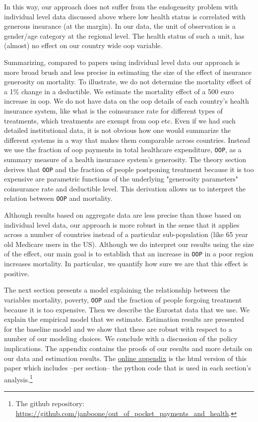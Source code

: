 \documentclass[a4paper,12pt]{article}
\begin{document}
In this way, our approach does not suffer from the endogeneity problem with individual level data discussed above where low health status is correlated with generous insurance (at the margin). In our data, the unit of observation is a gender/age category at the regional level. The health status of such a unit, has (almost) no effect on our country wide oop variable.

Summarizing, compared to papers using individual level data our approach is more broad brush and less precise in estimating the size of the effect of insurance generosity on mortality. To illustrate, we do not determine the mortality effect of a 1\% change in a deductible. We estimate the mortality effect of a 500 euro increase in oop. We do not have data on the oop details of each country's health insurance system, like what is the coinsurance rate for different types of treatments, which treatments are exempt from oop etc. Even if we had such detailed institutional data, it is not obvious how one would summarize the different systems in a way that makes them comparable across countries. Instead we use the fraction of oop payments in total healthcare expenditure, \texttt{OOP}, as a summary measure of a health insurance system's generosity. The theory section derives that \texttt{OOP} and the fraction of people postponing treatment because it is too expensive are parametric functions of the underlying "generosity parameters" coinsurance rate and deductible level. This derivation allows us to interpret the relation between \texttt{OOP} and mortality.

Although results based on aggregate data are less precise than those based on individual level data, our approach is more robust in the sense that it applies across a number of countries instead of a particular sub-population (like 65 year old Medicare users in the US). Although we do interpret our results using the size of the effect, our main goal is to establish that an increase in \texttt{OOP} in a poor region increases mortality. In particular, we quantify how sure we are that this effect is positive.

The next section presents a model explaining the relationship between the variables mortality, poverty, \texttt{OOP} and the fraction of people forgoing treatment because it is too expensive. Then we describe the Eurostat data that we use. We explain the empirical model that we estimate. Estimation results are presented for the baseline model and we show that these are robust with respect to a number of our modeling choices. We conclude with a discussion of the policy implications. The appendix contains the proofs of our results and more details on our data and estimation results. The \href{https://janboone.github.io/out\_of\_pocket\_payments\_and\_health/index.html}{online appendix} is the html version of this paper which includes --per section-- the python code that is used in each section's analysis.\footnote{The github repository: \url{https://github.com/janboone/out\_of\_pocket\_payments\_and\_health}.}
\end{document}
